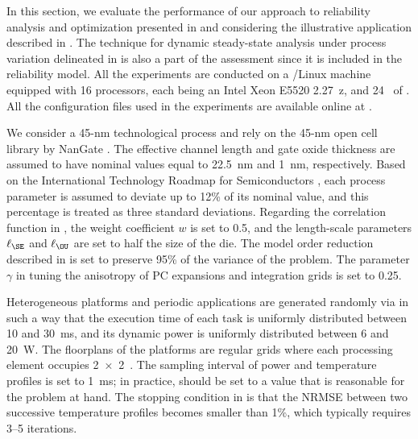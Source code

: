 In this section, we evaluate the performance of our approach to reliability
analysis and optimization presented in  and
 considering the illustrative application described in
. The technique for dynamic steady-state
analysis under process variation delineated in
 is also a part of the assessment since it
is included in the reliability model. All the experiments are conducted on a
/Linux machine equipped with 16 processors, each being an Intel Xeon
E5520 2.27~z, and 24~ of . All the configuration files
used in the experiments are available online at \cite{eslab2015}.

We consider a 45-nm technological process and rely on the 45-nm open cell
library by NanGate \cite{nangate}. The effective channel length and gate oxide
thickness are assumed to have nominal values equal to 22.5~nm and 1~nm,
respectively. Based on the International Technology Roadmap for Semiconductors
\cite{itrs}, each process parameter is assumed to deviate up to 12\% of its
nominal value, and this percentage is treated as three standard deviations.
Regarding the correlation function in , the weight
coefficient $w$ is set to 0.5, and the length-scale parameters $\ell_\SE$ and
$\ell_\OU$ are set to half the size of the die. The model order reduction
described in  is set to preserve 95\% of the
variance of the problem. The parameter $\gamma$ in
 tuning the anisotropy of \ac{PC} expansions and
integration grids is set to 0.25.

Heterogeneous platforms and periodic applications are generated randomly via
 \cite{dick1998} in such a way that the execution time of each task is
uniformly distributed between 10 and 30~ms, and its dynamic power is uniformly
distributed between 6 and 20~W. The floorplans of the platforms are regular
grids where each processing element occupies 2~×~2~. The sampling
interval \dt of power and temperature profiles is set to 1~ms; in practice, \dt
should be set to a value that is reasonable for the problem at hand. The
stopping condition in  is that the
\ac{NRMSE} between two successive temperature profiles becomes smaller than 1\%,
which typically requires 3--5 iterations.


